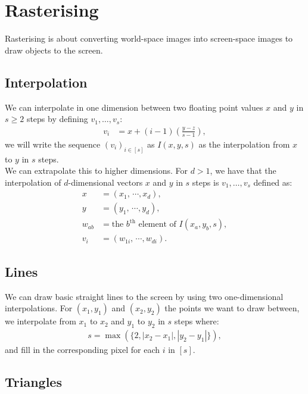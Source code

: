 \section{Rasterising}

Rasterising is about converting world-space images into screen-space images to draw
objects to the screen.

\subsection{Interpolation}

We can interpolate in one dimension between two floating point values
$x$ and $y$ in $s \geq 2$ steps by defining $v_1, \ldots, v_s$: \begin{align*}
    v_i &= x + (i - 1) \left(\frac{y - z}{s - 1}\right),
\end{align*} we will write the sequence $(v_i)_{i \in [s]}$ as $I(x, y, s)$ as
the interpolation from $x$ to $y$ in $s$ steps.
\\[\baselineskip]
We can extrapolate this to higher dimensions. For $d > 1$, we have that the interpolation of
$d$-dimensional vectors $x$ and $y$ in $s$ steps is $v_1, \ldots, v_s$ defined as: \begin{align*}
    x &= (x_1, \,\cdots, x_d), \\
    y &= (y_1, \,\cdots, y_d), \\
    w_{ab} &= \text{the $b^\text{th}$ element of } I(x_a, y_b, s), \\
    v_i &= (w_{1i}, \,\cdots, w_{di}).
\end{align*}

\subsection{Lines}

We can draw basic straight lines to the screen by using two one-dimensional
interpolations. For $(x_1, y_1)$ and $(x_2, y_2)$ the points we want to draw
between, we interpolate from $x_1$ to $x_2$ and $y_1$ to $y_2$ in $s$ steps
where: \begin{align*}
    s = \max(\{ 2, |x_2 - x_1|, |y_2 - y_1| \}),
\end{align*} and fill in the corresponding pixel for each $i$ in $[s]$.

\subsection{Triangles}

